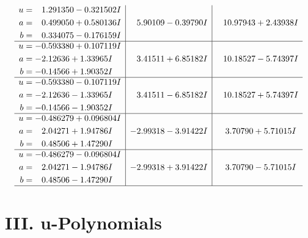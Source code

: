 \documentclass[1p]{elsarticle_modified}
\theoremstyle{definition}
\begin{document}
$$\begin{array}{c|c|c}
\begin{aligned}
u &= \phantom{-}1.291350 - 0.321502 I \\
a &= \phantom{-}0.499050 + 0.580136 I \\
b &= \phantom{-}0.334075 - 0.176159 I\end{aligned}
 & \phantom{-}5.90109 - 0.39790 I & \phantom{-}10.97943 + 2.43938 I \\ \hline\begin{aligned}
u &= -0.593380 + 0.107119 I \\
a &= -2.12636 + 1.33965 I \\
b &= -0.14566 + 1.90352 I\end{aligned}
 & \phantom{-}3.41511 + 6.85182 I & \phantom{-}10.18527 - 5.74397 I \\ \hline\begin{aligned}
u &= -0.593380 - 0.107119 I \\
a &= -2.12636 - 1.33965 I \\
b &= -0.14566 - 1.90352 I\end{aligned}
 & \phantom{-}3.41511 - 6.85182 I & \phantom{-}10.18527 + 5.74397 I \\ \hline\begin{aligned}
u &= -0.486279 + 0.096804 I \\
a &= \phantom{-}2.04271 + 1.94786 I \\
b &= \phantom{-}0.48506 + 1.47290 I\end{aligned}
 & -2.99318 - 3.91422 I & \phantom{-}3.70790 + 5.71015 I \\ \hline\begin{aligned}
u &= -0.486279 - 0.096804 I \\
a &= \phantom{-}2.04271 - 1.94786 I \\
b &= \phantom{-}0.48506 - 1.47290 I\end{aligned}
 & -2.99318 + 3.91422 I & \phantom{-}3.70790 - 5.71015 I\\
 \hline 
 \end{array}$$\newpage
\newpage\renewcommand{\arraystretch}{1}
\centering \section*{ III. u-Polynomials}
\end{document}
